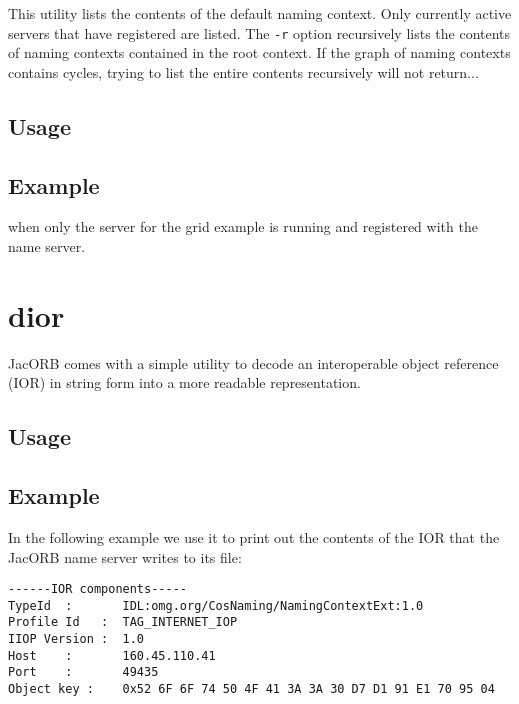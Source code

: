 \documentclass[12pt]{scrbook}
\begin{document}
This utility  lists the contents  of the default naming  context. Only
currently active servers that have registered are listed. The {\tt -r}
option recursively lists the  contents of naming contexts contained in
the root  context. If  the graph of  naming contexts  contains cycles,
trying to list the entire contents recursively will not return...

\subsection*{Usage}



\subsection*{Example}


when only the server for the grid example is running and registered
with the name server.


\section{dior}

JacORB comes with a simple utility to decode an interoperable object reference
(IOR) in string form into a more readable representation. 

\subsection*{Usage}


\subsection*{Example}

In the following example we use it to print out the contents of the
IOR that the JacORB name server writes to its file:

\small{\begin{verbatim}
------IOR components-----
TypeId  :       IDL:omg.org/CosNaming/NamingContextExt:1.0
Profile Id   :  TAG_INTERNET_IOP
IIOP Version :  1.0
Host    :       160.45.110.41
Port    :       49435
Object key :    0x52 6F 6F 74 50 4F 41 3A 3A 30 D7 D1 91 E1 70 95 04 
\end{verbatim}
}
\end{document}
